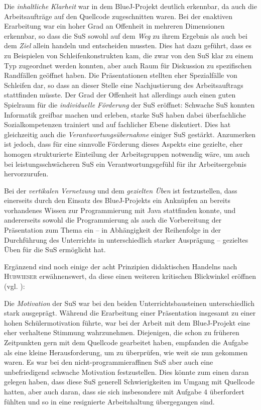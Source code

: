 \documentclass[paper=a4, DIV=13, BCOR=12mm, twoside=on, onecolumn=on, open = any, titlepage =on, parskip =half-, headsepline = on, footsepline = on, chapterprefix = on, sectionprefix = on, appendixprefix = off, fontsize = 12pt, numbers = noenddot, abstract = off]{scrreprt}
\begin{document}
Die \emph{inhaltliche Klarheit} war in dem BlueJ-Projekt deutlich erkennbar, da auch die Arbeitsaufträge auf den Quellcode zugeschnitten waren. Bei der enaktiven Erarbeitung war ein hoher Grad an Offenheit in mehreren Dimensionen erkennbar, so dass die SuS sowohl auf dem \emph{Weg} zu ihrem Ergebnis als auch bei dem \emph{Ziel} allein handeln und entscheiden mussten. Dies hat dazu geführt, dass es zu Beispielen von Schleifenkonstrukten kam, die zwar von den SuS klar zu einem Typ zugeordnet werden konnten, aber auch Raum für Diskussion zu spezifischen Randfällen geöffnet haben. Die Präsentationen stellten eher Spezialfälle von Schleifen dar, so dass an dieser Stelle eine Nachjustierung des Arbeitsauftrags stattfinden müsste. Der Grad der Offenheit hat allerdings auch einen guten Spielraum für die \emph{individuelle Förderung} der SuS eröffnet: Schwache SuS konnten Informatik greifbar machen und erleben, starke SuS haben dabei überfachliche Sozialkompetenzen trainiert und auf fachlicher Ebene diskutiert. Dies hat gleichzeitig auch die \emph{Verantwortungsübernahme} einiger SuS gestärkt. Anzumerken ist jedoch, dass für eine sinnvolle Förderung dieses Aspekts eine gezielte, eher homogen strukturierte Einteilung der Arbeitsgruppen notwendig wäre, um auch bei leistungsschwächeren SuS ein Verantwortungsgefühl für ihr Arbeitsergebnis hervorzurufen.

Bei der \emph{vertikalen Vernetzung} und dem \emph{gezielten Üben} ist festzustellen, dass einerseits durch den Einsatz des BlueJ-Projekts ein Anknüpfen an bereits vorhandenes Wissen zur Programmierung mit Java stattfinden konnte, und andererseits sowohl die Programmierung als auch die Vorbereitung der Präsentation zum Thema ein -- in Abhängigkeit der Reihenfolge in der Durchführung des Unterrichts in unterschiedlich starker Ausprägung -- gezieltes Üben für die SuS ermöglicht hat.

Ergänzend sind noch einige der acht Prinzipien didaktischen Handelns nach \textsc{Hubwieser} erwähnenswert, da diese einen weiteren kritischen Blickwinkel eröffnen (vgl. \cite[S.15ff.]{hubwieser:07}):

Die \emph{Motivation} der SuS war bei den beiden Unterrichtsbausteinen unterschiedlich stark ausgeprägt. Während die Erarbeitung einer Präsentation insgesamt zu einer hohen Schülermotivation führte, war bei der Arbeit mit dem BlueJ-Projekt eine eher verhaltene Stimmung wahrzunehmen. Diejenigen, die schon zu früheren Zeitpunkten gern mit dem Quellcode gearbeitet haben, empfanden die Aufgabe als eine kleine Herausforderung, um zu überprüfen, wie weit sie nun gekommen waren. Es war bei den nicht-programmieraffinen SuS aber auch eine unbefriedigend schwache Motivation festzustellen. Dies könnte zum einen daran gelegen haben, dass diese SuS generell Schwierigkeiten im Umgang mit Quellcode hatten, aber auch daran, dass sie sich insbesondere mit Aufgabe 4 überfordert fühlten und so in eine resignierte Arbeitshaltung übergegangen sind. 
\end{document}
